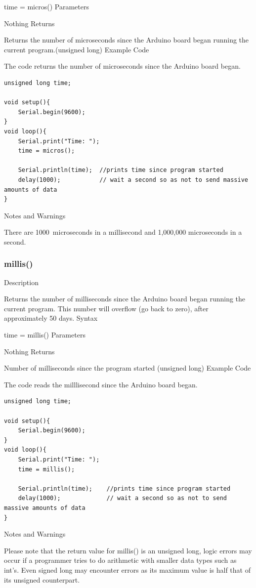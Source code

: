 \documentclass[12pt,a4paper]{report}  %
\begin{document}
time = micros()
Parameters

Nothing
Returns

Returns the number of microseconds since the Arduino board began running the current program.(unsigned long)
Example Code

The code returns the number of microseconds since the Arduino board began.

\begin{lstlisting}[label=digitalwrite,caption=micros]
unsigned long time;

void setup(){
	Serial.begin(9600);
}
void loop(){
	Serial.print("Time: ");
	time = micros();

	Serial.println(time);  //prints time since program started
	delay(1000);           // wait a second so as not to send massive amounts of data
}
\end{lstlisting}

Notes and Warnings

There are 1000~microseconds in a millisecond and 1,000,000 microseconds in a second.

\subsubsection{millis()}\label{millis}

Description

Returns the number of milliseconds since the Arduino board began running the current program. This number will overflow (go back to zero), after approximately 50 days.
Syntax

time = millis()
Parameters

Nothing
Returns

Number of milliseconds since the program started (unsigned long)
Example Code

The code reads the milllisecond since the Arduino board began.

\begin{lstlisting}[label=digitalwrite,caption=milis]
unsigned long time;

void setup(){
	Serial.begin(9600);
}
void loop(){
	Serial.print("Time: ");
	time = millis();

	Serial.println(time);    //prints time since program started
	delay(1000);             // wait a second so as not to send massive amounts of data
}
\end{lstlisting}

Notes and Warnings

Please note that the return value for millis() is an unsigned long, logic errors may occur if a programmer tries to do arithmetic with smaller data types such as int’s. Even signed long may encounter errors as its maximum value is half that of its unsigned counterpart.
\end{document}
